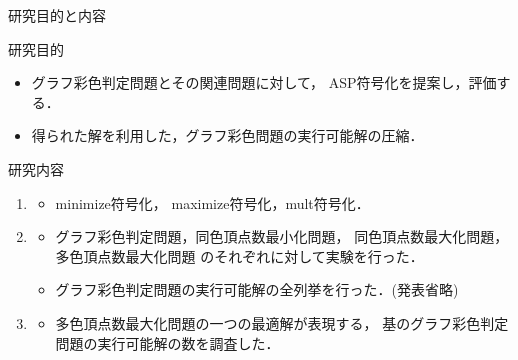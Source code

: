 \documentclass[dvipdfmx,11pt]{beamer}
\begin{document}
\begin{frame}{研究目的と内容}
 \begin{alertblock}{研究目的}%
  \begin{itemize}
   \item グラフ彩色判定問題とその関連問題に対して，
         ASP符号化を提案し，評価する．
   \item 得られた解を利用した，グラフ彩色問題の実行可能解の圧縮．
  \end{itemize}
 \end{alertblock}

 \begin{block}{研究内容}
  \begin{enumerate}
   \item {}
         \begin{itemize}
          \item %
                minimize符号化，
                maximize符号化，mult符号化．
         \end{itemize}
   \item {}
         \begin{itemize}
          \item グラフ彩色判定問題，同色頂点数最小化問題，
                同色頂点数最大化問題，多色頂点数最大化問題
                のそれぞれに対して実験を行った．
          \item グラフ彩色判定問題の実行可能解の全列挙を行った．(発表省略)
         \end{itemize}
   \item {}
         \begin{itemize}
          \item 多色頂点数最大化問題の一つの最適解が表現する，
		基のグラフ彩色判定問題の実行可能解の数を調査した．
         \end{itemize}
  \end{enumerate}
 \end{block}
\end{frame}
\end{document}
